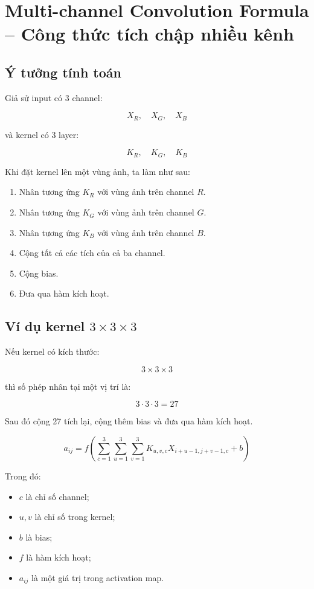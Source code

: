 \section{Multi-channel Convolution Formula -- Công thức tích chập nhiều kênh}

\subsection{Ý tưởng tính toán}

Giả sử input có 3 channel:

\[
    X_R,\quad X_G,\quad X_B
\]

và kernel có 3 layer:

\[
    K_R,\quad K_G,\quad K_B
\]

Khi đặt kernel lên một vùng ảnh, ta làm như sau:

\begin{enumerate}[label=\arabic*.]
    \item Nhân tương ứng $K_R$ với vùng ảnh trên channel $R$.
    \item Nhân tương ứng $K_G$ với vùng ảnh trên channel $G$.
    \item Nhân tương ứng $K_B$ với vùng ảnh trên channel $B$.
    \item Cộng tất cả các tích của cả ba channel.
    \item Cộng bias.
    \item Đưa qua hàm kích hoạt.
\end{enumerate}

\subsection{Ví dụ kernel $3\times3\times3$}

Nếu kernel có kích thước:

\[
    3\times3\times3
\]

thì số phép nhân tại một vị trí là:

\[
    3 \cdot 3 \cdot 3 = 27
\]

Sau đó cộng 27 tích lại, cộng thêm bias và đưa qua hàm kích hoạt.

\[
    a_{ij}
    =
    f
    \left(
    \sum_{c=1}^{3}
    \sum_{u=1}^{3}
    \sum_{v=1}^{3}
    K_{u,v,c}
    X_{i+u-1,j+v-1,c}
    +
    b
    \right)
\]

Trong đó:

\begin{itemize}
    \item $c$ là chỉ số channel;
    \item $u,v$ là chỉ số trong kernel;
    \item $b$ là bias;
    \item $f$ là hàm kích hoạt;
    \item $a_{ij}$ là một giá trị trong activation map.
\end{itemize}

